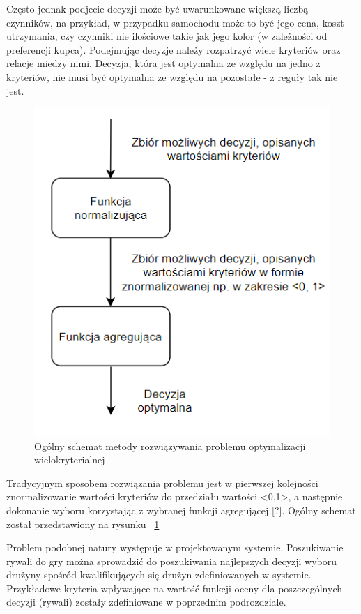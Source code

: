 Często jednak podjecie decyzji może być uwarunkowane większą liczbą czynników, na przykład, w przypadku samochodu może to być jego cena, koszt utrzymania, czy czynniki nie ilościowe takie jak jego kolor (w zależności od preferencji kupca). Podejmując decyzje należy rozpatrzyć wiele kryteriów oraz relacje miedzy nimi. Decyzja, która jest optymalna ze względu na jedno z kryteriów, nie musi być optymalna ze względu na pozostałe - z reguły tak nie jest.

\begin{figure}[ht]
\centering
\includegraphics[width=0.5\linewidth]{03-koncept/rys/tradycyjne-algorytmy-opt.PNG}
\caption{Ogólny schemat metody rozwiązywania problemu optymalizacji wielokryterialnej}
\label{fig:diagram-trad-alg-opt}
\end{figure}

Tradycyjnym sposobem rozwiązania problemu jest w pierwszej kolejności znormalizowanie wartości kryteriów do przedziału wartości <0,1>, a następnie dokonanie wyboru korzystając z wybranej funkcji agregującej [?]. Ogólny schemat został przedstawiony na rysunku ~\ref{fig:diagram-trad-alg-opt}

Problem podobnej natury występuje w projektowanym systemie. Poszukiwanie rywali do gry można sprowadzić do poszukiwania najlepszych decyzji wyboru drużyny spośród kwalifikujących się drużyn zdefiniowanych w systemie. Przykładowe kryteria wpływające na wartość funkcji oceny dla poszczególnych decyzji (rywali) zostały zdefiniowane w poprzednim podrozdziale.

